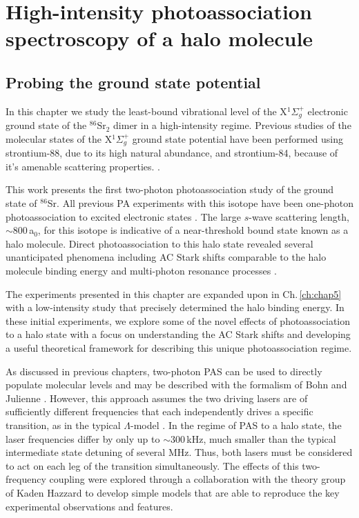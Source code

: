 \chapter{High-intensity photoassociation spectroscopy of a halo molecule} \label{ch:chap4}
\section{Probing the ground state potential} \label{sec:highE_intro}
In this chapter we study the least-bound vibrational level of the X$^1\Sigma_g^+$ electronic ground state of the $^{86}$Sr$_2$ dimer in a high-intensity regime.
Previous studies of the molecular states of the X$^1\Sigma_g^+$ ground state potential have been performed using strontium-88, due to its high natural abundance, and strontium-84, because of it's amenable scattering properties. \cite{Reinaudi2012, McGuyer2014, McGuyer2015a, rom12, Stellmer2012}.

This work presents the first two-photon photoassociation study of the ground state of $^{86}$Sr.
All previous PA experiments with this isotope have been one-photon photoassociation to excited electronic states \cite{Mickelson2005,Borkowski2014a,Reschovsky2018}.
The large $s$-wave scattering length, $\sim$800\,a$_0$, for this isotope is indicative of a near-threshold bound state known as a halo molecule.
Direct photoassociation to this halo state revealed several unanticipated phenomena including AC Stark shifts comparable to the halo molecule binding energy and multi-photon resonance processes \cite{Kon2018}.

The experiments presented in this chapter are expanded upon in Ch.\,\ref{ch:chap5} with a low-intensity study that precisely determined the halo binding energy. 
In these initial experiments, we explore some of the novel effects of photoassociation to a halo state with a focus on understanding the AC Stark shifts and developing a useful theoretical framework for describing this unique photoassociation regime.

As discussed in previous chapters, two-photon PAS can be used to directly populate molecular levels and may be described with the formalism of Bohn and Julienne \cite{Bohn1999}.
However, this approach assumes the two driving lasers are of sufficiently different frequencies that each independently drives a specific transition, as in the typical $\Lambda$-model \cite{Wynar2000, Bohn1996}.
In the regime of PAS to a halo state, the laser frequencies differ by only up to $\sim\!300$\,kHz, much smaller than the typical intermediate state detuning of several MHz.
Thus, both lasers must be considered to act on each leg of the transition simultaneously.
The effects of this two-frequency coupling were explored through a collaboration with the theory group of Kaden Hazzard to develop simple models that are able to reproduce the key experimental observations and features.

